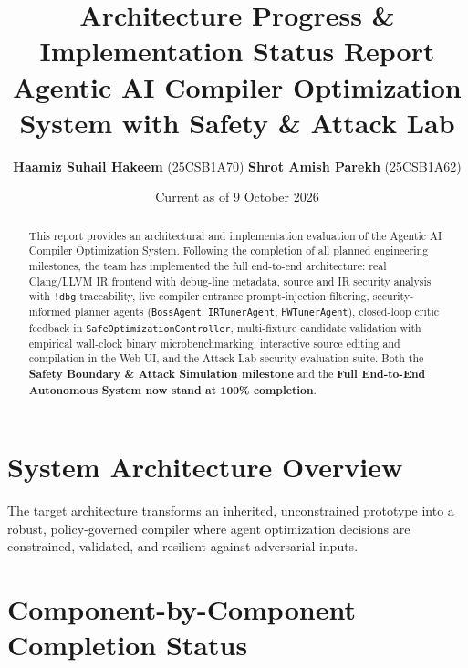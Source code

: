 \documentclass[11pt]{article}
\title{\vspace{-1.2em}\textbf{Architecture Progress \& Implementation Status Report}\\
\large Agentic AI Compiler Optimization System with Safety \& Attack Lab}
\author{\textbf{Haamiz Suhail Hakeem} (25CSB1A70) \quad \textbf{Shrot Amish Parekh} (25CSB1A62)}
\date{Current as of 9 October 2026}
\begin{document}
\maketitle
\vspace{-1.5em}

\begin{abstract}
This report provides an architectural and implementation evaluation of the Agentic AI Compiler Optimization System. Following the completion of all planned engineering milestones, the team has implemented the full end-to-end architecture: real Clang/LLVM IR frontend with debug-line metadata, source and IR security analysis with \texttt{!dbg} traceability, live compiler entrance prompt-injection filtering, security-informed planner agents (\texttt{BossAgent}, \texttt{IRTunerAgent}, \texttt{HWTunerAgent}), closed-loop critic feedback in \texttt{SafeOptimizationController}, multi-fixture candidate validation with empirical wall-clock binary microbenchmarking, interactive source editing and compilation in the Web UI, and the Attack Lab security evaluation suite. Both the \textbf{Safety Boundary \& Attack Simulation milestone} and the \textbf{Full End-to-End Autonomous System now stand at 100\% completion}.
\end{abstract}

\section{System Architecture Overview}
The target architecture transforms an inherited, unconstrained prototype into a robust, policy-governed compiler where agent optimization decisions are constrained, validated, and resilient against adversarial inputs.

\begin{center}
\end{center}

\section{Component-by-Component Completion Status}
\end{document}

